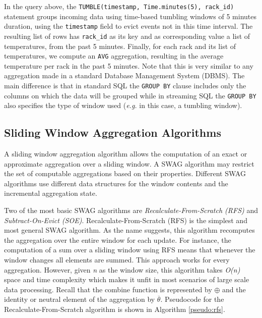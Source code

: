 In the query above, the
\texttt{TUMBLE(timestamp, Time.minutes(5), rack\_id)} statement groups incoming data using time-based tumbling windows of 5 minutes duration, using the \texttt{timestamp} field to evict events not in this time interval. The resulting list of rows has \texttt{rack\_id} as its key and as corresponding value a list of temperatures, from the past 5 minutes. Finally, for each rack and its list of temperatures, we compute an \texttt{AVG} aggregation, resulting in the average temperature per rack in the past 5 minutes. Note that this is very similar to any aggregation made in a standard Database Management System (DBMS). The main difference is that in standard SQL the \texttt{GROUP BY} clause includes only the columns on which the data will be grouped while in streaming SQL the \texttt{GROUP BY} also specifies the type of window used (\textit{e.g.} in this case, a tumbling window).


\subsection{Sliding Window Aggregation Algorithms} \label{sec:back-swag-algs}

A sliding window aggregation algorithm allows the computation of an exact or approximate aggregation over a sliding window. A SWAG algorithm may restrict the set of computable aggregations based on their properties. Different SWAG algorithms use different data structures for the window contents and the incremental aggregation state.

Two of the most basic SWAG algorithms are \textit{Recalculate-From-Scratch (RFS)} and \textit{Subtract-On-Evict (SOE)}. Recalculate-From-Scratch (RFS) is the simplest and most general SWAG algorithm. As the name suggests, this algorithm recomputes the aggregation over the entire window for each update. For instance, the computation of a sum over a sliding window using RFS means that whenever the window changes all elements are summed. This approach works for every aggregation. However, given \textit{n} as the window size, this algorithm takes \textit{O(n)} space and time complexity which makes it unfit in most scenarios of large scale data processing. Recall that the combine function is represented by $\oplus$ and the identity or neutral element of the aggregation by $\overline{\theta}$. Pseudocode for the Recalculate-From-Scratch algorithm is shown in Algorithm \ref{pseudo:rfs}.
  

